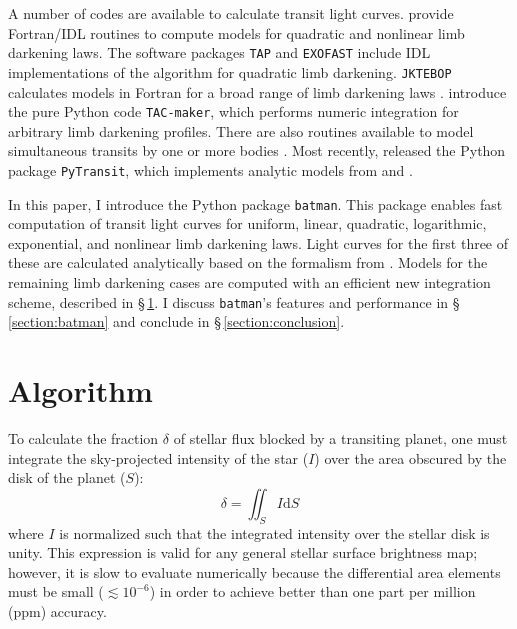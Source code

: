 \documentclass[12pt,preprint]{aastex}
\begin{document}
A number of codes are available to calculate transit light curves. \cite{mandel02} provide Fortran/IDL routines to compute models for quadratic and nonlinear limb darkening laws. The software packages \texttt{TAP} \citep{gazak12} and \texttt{EXOFAST} \citep{eastman13} include IDL implementations of the \cite{mandel02} algorithm for quadratic limb darkening. \texttt{JKTEBOP} calculates models in Fortran for a broad range of limb darkening laws \citep{southworth04}. \cite{kjurkchieva13} introduce the pure Python code \texttt{TAC-maker}, which performs numeric integration for arbitrary limb darkening profiles. There are also routines available to model simultaneous transits by one or more bodies \citep{kipping11, pal12}.  Most recently, \cite{parvianinen15} released the Python package \texttt{PyTransit}, which implements analytic models from \cite{mandel02} and \cite{gimenez06}.  

In this paper, I introduce the Python package \texttt{batman}.  This package enables fast computation of transit light curves for uniform, linear, quadratic, logarithmic, exponential, and nonlinear limb darkening laws. Light curves for the first three of these are calculated analytically based on the formalism from \cite{mandel02}.  Models for the remaining limb darkening cases are computed with an efficient new integration scheme, described in \S\,\ref{section:algorithm}. I discuss \texttt{batman}'s features and performance in \S\,\ref{section:batman} and conclude in \S\,\ref{section:conclusion}.



\section{Algorithm}
\label{section:algorithm}
To calculate the fraction $\delta$ of stellar flux blocked by a transiting planet, one must integrate the sky-projected intensity of the star ($I$) over the area obscured by the disk of the planet ($S$):
\begin{equation}
\delta = \iint_S{I \mathrm{d}S}
\label{eqn:surfaceint}
\end{equation}
where $I$ is normalized such that the integrated intensity over the stellar disk is unity. This expression is valid for any general stellar surface brightness map; however, it is slow to evaluate numerically because the differential area elements must be small ($\lesssim 10^{-6}$) in order to achieve better than one part per million (ppm) accuracy.
\end{document}
